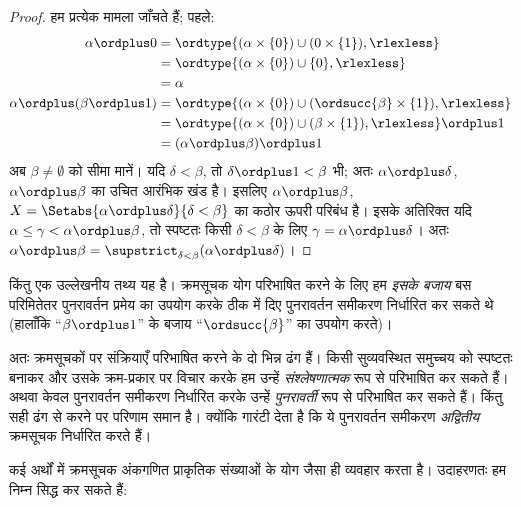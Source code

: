 \documentclass[../../../include/open-logic-section]{subfiles}
\begin{document}
\begin{proof}
हम प्रत्येक मामला जाँचते हैं; पहले:
\begin{align*}
	\alpha \ordplus  0 
	& = \ordtype{(\alpha \times \{0\}) \cup (0 \times \{1\}), \rlexless} \\
	&= \ordtype{(\alpha \times \{0\}) \cup \{0\}, \rlexless}\\
	&= \alpha\\
	\alpha \ordplus (\beta \ordplus  1) 
	&= \ordtype{(\alpha\times \{0\}) \cup (\ordsucc{\beta}\times \{1\}), \rlexless} \\
	&= \ordtype{(\alpha\times \{0\}) \cup (\beta \times \{1\}), \rlexless} \ordplus 1\\
	&= (\alpha \ordplus  \beta) \ordplus  1
\end{align*}
अब $\beta \neq \emptyset$ को सीमा मानें। यदि $\delta < \beta$, तो
$\delta\ordplus 1 < \beta$ भी; अतः $\alpha \ordplus \delta$,
$\alpha \ordplus \beta$ का उचित आरंभिक खंड है। इसलिए
$\alpha \ordplus \beta$, $X = \Setabs{\alpha \ordplus \delta}{\delta <
\beta}$ का कठोर ऊपरी परिबंध है। इसके अतिरिक्त यदि
$\alpha \leq \gamma < \alpha \ordplus \beta$, तो स्पष्टतः किसी
$\delta < \beta$ के लिए $\gamma = \alpha \ordplus \delta$। अतः
$\alpha \ordplus \beta =
\supstrict_{\delta< \beta}(\alpha\ordplus \delta)$।
\end{proof}

किंतु एक उल्लेखनीय तथ्य यह है। क्रमसूचक योग परिभाषित करने के लिए हम
\emph{इसके बजाय} बस परिमितेतर पुनरावर्तन प्रमेय का उपयोग करके ठीक
 में दिए पुनरावर्तन समीकरण निर्धारित कर सकते थे
(हालाँकि ``$\beta \ordplus 1$'' के बजाय ``$\ordsucc{\beta}$'' का उपयोग
करते)।

अतः क्रमसूचकों पर संक्रियाएँ परिभाषित करने के दो भिन्न ढंग हैं। किसी
सुव्यवस्थित समुच्चय को स्पष्टतः बनाकर और उसके क्रम-प्रकार पर विचार करके हम
उन्हें \emph{संश्लेषणात्मक} रूप से परिभाषित कर सकते हैं। अथवा केवल पुनरावर्तन
समीकरण निर्धारित करके उन्हें \emph{पुनरावर्ती} रूप से परिभाषित कर सकते हैं।
किंतु सही ढंग से करने पर परिणाम समान है। क्योंकि
 गारंटी देता है कि ये
पुनरावर्तन समीकरण \emph{अद्वितीय} क्रमसूचक निर्धारित करते हैं।

कई अर्थों में क्रमसूचक अंकगणित प्राकृतिक संख्याओं के योग जैसा ही व्यवहार
करता है। उदाहरणतः हम निम्न सिद्ध कर सकते हैं:
\end{document}
